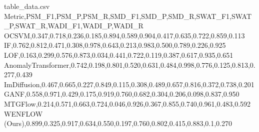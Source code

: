 
\begin{filecontents*}[overwrite]{table_data.csv}
Metric,PSM_F1,PSM_P,PSM_R,SMD_F1,SMD_P,SMD_R,SWAT_F1,SWAT_P,SWAT_R,WADI_F1,WADI_P,WADI_R
OCSVM,0.347,0.718,0.236,0.185,0.894,0.589,0.904,0.417,0.635,0.722,0.859,0.113
IF,0.762,0.812,0.471,0.308,0.978,0.643,0.213,0.983,0.500,0.789,0.226,0.925
LOF,0.163,0.299,0.576,0.873,0.034,0.441,0.722,0.119,0.387,0.617,0.935,0.651
AnomalyTransformer,0.742,0.198,0.801,0.520,0.631,0.484,0.998,0.776,0.125,0.813,0.277,0.439
ImDiffusion,0.467,0.665,0.227,0.849,0.115,0.308,0.489,0.657,0.816,0.372,0.738,0.201
GANF,0.558,0.971,0.429,0.175,0.919,0.760,0.682,0.304,0.206,0.098,0.837,0.950
MTGFlow,0.214,0.571,0.663,0.724,0.046,0.926,0.367,0.855,0.740,0.961,0.483,0.592
WENFLOW (Ours),0.899,0.325,0.917,0.634,0.550,0.197,0.760,0.802,0.415,0.883,0.1,0.270
\end{filecontents*}

\begin{table*}[htbp]
  \centering
  \caption{\textcolor{blue}{Dynamic table}}
\end{table*}

